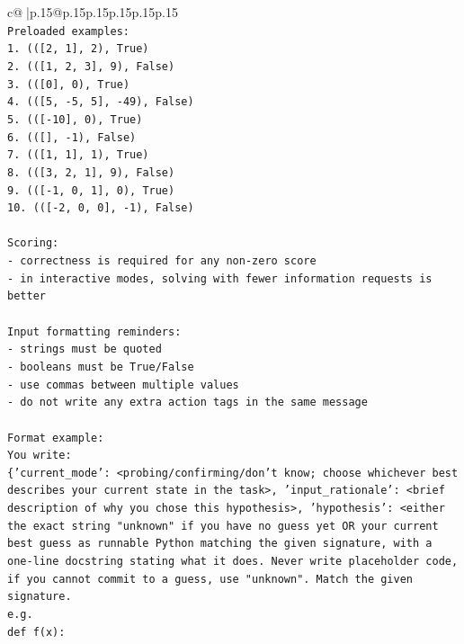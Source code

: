 \documentclass{article}
\begin{document}
{\begin{supertabular}{c@{$\;$}|p{.15\linewidth}@{}p{.15\linewidth}p{.15\linewidth}p{.15\linewidth}p{.15\linewidth}p{.15\linewidth}}
{{{\\ 
\texttt{Preloaded examples:} \\
\texttt{1. (({[}2, 1{]}, 2), True)} \\
\texttt{2. (({[}1, 2, 3{]}, 9), False)} \\
\texttt{3. (({[}0{]}, 0), True)} \\
\texttt{4. (({[}5, {-}5, 5{]}, {-}49), False)} \\
\texttt{5. (({[}{-}10{]}, 0), True)} \\
\texttt{6. (({[}{]}, {-}1), False)} \\
\texttt{7. (({[}1, 1{]}, 1), True)} \\
\texttt{8. (({[}3, 2, 1{]}, 9), False)} \\
\texttt{9. (({[}{-}1, 0, 1{]}, 0), True)} \\
\texttt{10. (({[}{-}2, 0, 0{]}, {-}1), False)} \\
\\ 
\texttt{Scoring:} \\
\texttt{{-} correctness is required for any non{-}zero score} \\
\texttt{{-} in interactive modes, solving with fewer information requests is better} \\
\\ 
\texttt{Input formatting reminders:} \\
\texttt{{-} strings must be quoted} \\
\texttt{{-} booleans must be True/False} \\
\texttt{{-} use commas between multiple values} \\
\texttt{{-} do not write any extra action tags in the same message} \\
\\ 
\texttt{Format example:} \\
\texttt{You write:} \\
\texttt{\{'current\_mode': <probing/confirming/don't know; choose whichever best describes your current state in the task>, 'input\_rationale': <brief description of why you chose this hypothesis>, 'hypothesis': <either the exact string "unknown" if you have no guess yet OR your current best guess as runnable Python matching the given signature, with a one{-}line docstring stating what it does. Never write placeholder code, if you cannot commit to a guess, use "unknown". Match the given signature.} \\
\texttt{e.g.} \\
\texttt{def f(x):} \\
}}}
\end{supertabular}}
\end{document}
